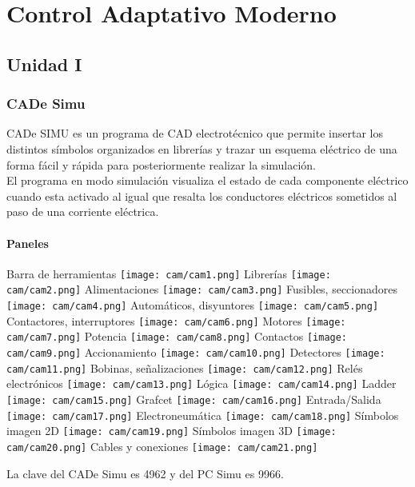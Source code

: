 \documentclass[
	12pt, %
	fleqn, %
	a4paper, %
	oneside, %
]{LegrandOrangeBook}
\begin{document}
\part{Control Adaptativo Moderno}

\chapter{Unidad I}
\section{CADe Simu}
CADe SIMU es un programa de CAD electrotécnico que permite insertar los distintos símbolos organizados en librerías y trazar un esquema eléctrico de una forma fácil y rápida para posteriormente realizar la simulación.\\
El programa en modo simulación visualiza el estado de cada componente eléctrico cuando esta activado al igual que resalta los conductores eléctricos sometidos al paso de una corriente eléctrica.
\subsection{Paneles}
\begin{center}
Barra de herramientas
\texttt{[image: cam/cam1.png]}
Librerías
\texttt{[image: cam/cam2.png]}
Alimentaciones
\texttt{[image: cam/cam3.png]}
Fusibles, seccionadores
\texttt{[image: cam/cam4.png]}
Automáticos, disyuntores
\texttt{[image: cam/cam5.png]}
Contactores, interruptores
\texttt{[image: cam/cam6.png]}
Motores
\texttt{[image: cam/cam7.png]}
Potencia
\texttt{[image: cam/cam8.png]}
Contactos
\texttt{[image: cam/cam9.png]}
Accionamiento
\texttt{[image: cam/cam10.png]}
Detectores
\texttt{[image: cam/cam11.png]}
Bobinas, señalizaciones
\texttt{[image: cam/cam12.png]}
Relés electrónicos
\texttt{[image: cam/cam13.png]}
Lógica
\texttt{[image: cam/cam14.png]}
Ladder
\texttt{[image: cam/cam15.png]}
Grafcet
\texttt{[image: cam/cam16.png]}
Entrada/Salida
\texttt{[image: cam/cam17.png]}
Electroneumática
\texttt{[image: cam/cam18.png]}
Símbolos imagen 2D
\texttt{[image: cam/cam19.png]}
Símbolos imagen 3D
\texttt{[image: cam/cam20.png]}
Cables y conexiones
\texttt{[image: cam/cam21.png]}
\end{center}
\begin{notation}
La clave del CADe Simu es 4962 y del PC Simu es 9966.
\end{notation}
\end{document}
